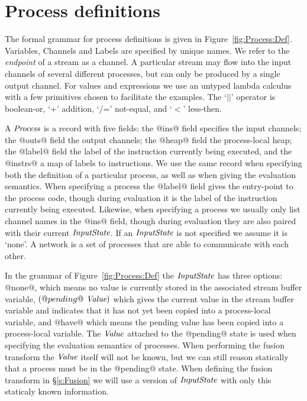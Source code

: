
\section{Process definitions}


The formal grammar for process definitions is given in Figure~\ref{fig:Process:Def}. Variables, Channels and Labels are specified by unique names. We refer to the \emph{endpoint} of a stream as a channel. A particular stream may flow into the input channels of several different processes, but can only be produced by a single output channel. For values and expressions we use an untyped lambda calculus with a few primitives chosen to facilitate the examples. The `$||$' operator is boolean-or, `+' addition, `/=' not-equal, and `$<$' less-then.

A $\textit{Process}$ is a record with five fields: the @ins@ field specifies the input channels; the @outs@ field the output channels; the @heap@ field the process-local heap; the @label@ field the label of the instruction currently being executed, and the @instrs@ a map of labels to instructions. We use the same record when specifying both the definition of a particular process, as well as when giving the evaluation semantics. When specifying a process the @label@ field gives the entry-point to the process code, though during evaluation it is the label of the instruction currently being executed. Likewise, when specifying a process we usually only list channel names in the @ins@ field, though during evaluation they are also paired with their current $\textit{InputState}$. If an $\textit{InputState}$ is not specified we assume it is `none'. A network is a set of processes that are able to communicate with each other.

In the grammar of Figure~\ref{fig:Process:Def} the $\textit{InputState}$ has three options: @none@, which means no value is currently stored in the associated stream buffer variable, $(@pending@~\textit{Value})$ which gives the current value in the stream buffer variable and indicates that it has not yet been copied into a process-local variable, and @have@ which means the pending value has been copied into a process-local variable. The $\textit{Value}$ attached to the @pending@ state is used when specifying the evaluation semantics of processes. When performing the fusion transform the $\textit{Value}$ itself will not be known, but we can still reason statically that a process must be in the @pending@ state. When defining the fusion transform in \S\ref{s:Fusion} we will use a version of $\textit{InputState}$ with only this staticaly known information.

